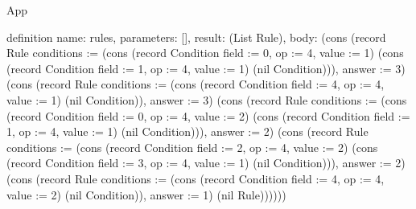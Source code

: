 \begin{lexlean}{App}
\begin{semanticmodule}
definition{
  name: rules,
  parameters: [],
  result: (List Rule),
  body: (cons (record Rule {conditions := (cons (record Condition {field := 0, op := 4, value := 1}) (cons (record Condition {field := 1, op := 4, value := 1}) (nil Condition))), answer := 3}) (cons (record Rule {conditions := (cons (record Condition {field := 4, op := 4, value := 1}) (nil Condition)), answer := 3}) (cons (record Rule {conditions := (cons (record Condition {field := 0, op := 4, value := 2}) (cons (record Condition {field := 1, op := 4, value := 1}) (nil Condition))), answer := 2}) (cons (record Rule {conditions := (cons (record Condition {field := 2, op := 4, value := 2}) (cons (record Condition {field := 3, op := 4, value := 1}) (nil Condition))), answer := 2}) (cons (record Rule {conditions := (cons (record Condition {field := 4, op := 4, value := 2}) (nil Condition)), answer := 1}) (nil Rule))))))
}


\end{semanticmodule}
\end{lexlean}
